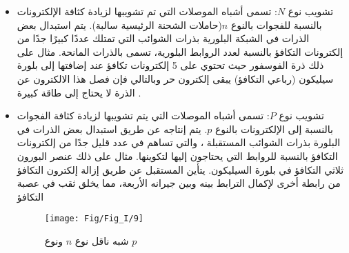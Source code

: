 \begin{itemize}
	\item تشويب نوع $ N $: 
	تسمى أشباه الموصلات التي تم تشويبها لزيادة كثافة الإلكترونات بالنسبة للفجوات بالنوع $ n $(حاملات الشحنة الرئيسية سالبة). يتم  استبدال بعض الذرات في الشبكة البلورية بذرات الشوائب التي تمتلك عددًا كبيرًا جدًا من إلكترونات التكافؤ بالنسبة لعدد الروابط البلورية، تسمى بالذرات المانحة. مثال على ذلك ذرة الفوسفور حيث تحتوي على 5 إلكترونات تكافؤ عند إضافتها إلى بلورة سيليكون (رباعي التكافؤ) يبقى إلكترون حر وبالتالي فإن فصل هذا الالكترون عن الذرة لا يحتاج إلى طاقة كبيرة . 
	
	\item تشويب نوع $ P $: 
	تسمى أشباه الموصلات التي يتم تشويبها لزيادة كثافة الفجوات بالنسبة إلى الإلكترونات بالنوع $ p $. يتم إنتاجه عن طريق استبدال بعض الذرات في البلورة بذرات الشوائب المستقبلة ، والتي تساهم في عدد قليل جدًا من إلكترونات التكافؤ بالنسبة للروابط التي يحتاجون إليها لتكوينها. مثال على ذلك عنصر البورون ثلاثي التكافؤ في بلورة  السيليكون. يتأين المستقبل عن طريق إزالة إلكترون التكافؤ من رابطة أخرى لإكمال الترابط بينه وبين جيرانه الأربعة، مما يخلق ثقب في عصبة التكافؤ
	\begin{figure}[h!]
		\centering
		\texttt{[image: Fig/Fig\_I/9]}
		\caption{شبه ناقل نوع $ n $ ونوع $ p $}
		\label{fig:9}
	\end{figure}
	\FloatBarrier

\end{itemize}
